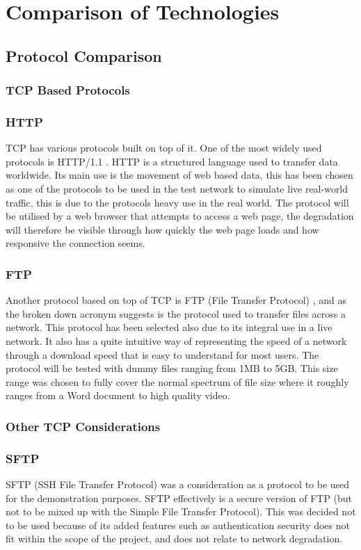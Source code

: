 \section{Comparison of Technologies}

\subsection{Protocol Comparison}
\subsubsection{TCP Based Protocols}

\subsubsection*{HTTP}
TCP has various protocols built on top of it. One of the most widely used protocols is HTTP/1.1 \citep{HTTP}. HTTP is a structured language used to transfer data worldwide. Its main use is the movement of web based data, this has been chosen as one of the protocols to be used in the test network to simulate live real-world traffic, this is due to the protocols heavy use in the real world. The protocol will be utilised by a web browser that attempts to access a web page, the degradation will therefore be visible through how quickly the web page loads and how responsive the connection seems.


\subsubsection*{FTP}
Another protocol based on top of TCP is FTP (File Transfer Protocol) \citep{FTP}, and as the broken down acronym suggests is the protocol used to transfer files across a network. This protocol has been selected also due to its integral use in a live network. It also has a quite intuitive way of representing the speed of a network through a download speed that is easy to understand for most users. The protocol will be tested with dummy files ranging from 1MB to 5GB. This size range was chosen to fully cover the normal spectrum of file size where it roughly ranges from a Word document to high quality video.

\subsubsection{Other TCP Considerations}

\subsubsection*{SFTP}
SFTP (SSH File Transfer Protocol) \citep{SFTP} was a consideration as a protocol to be used for the demonstration purposes. SFTP effectively is a secure version of FTP (but not to be mixed up with the Simple File Transfer Protocol). This was decided not to be used because of its added features such as authentication security does not fit within the scope of the project, and does not relate to network degradation. 

